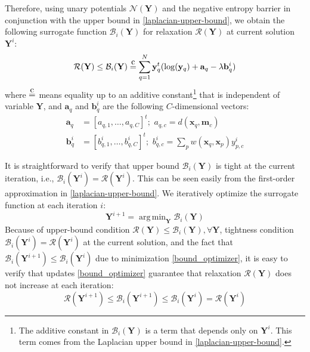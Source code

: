 \documentclass{article}
\DeclareMathOperator*{\argmin}{arg\,min}
\newcommand{\yy}{{\mathbf y}}
\newcommand{\Ncal}{\mathcal{N}}
\newcommand{\Bcal}{\mathcal{B}}
\newcommand{\Rcal}{\mathcal{R}}
\newcommand{\xxq}{\mathbf{x}}
\newcommand{\YY}{\mathbf Y}
\newcommand{\mm}{{\mathbf m}}
\newcommand{\ceq}{\stackrel{\mathclap{\normalfont\mbox{c}}}{=}}
\begin{document}
Therefore, using unary potentials $\Ncal(\YY)$ and the negative entropy barrier
in conjunction with the upper bound in \eqref{laplacian-upper-bound},
we obtain the following surrogate function $\Bcal_i(\YY)$ 
for relaxation $\Rcal(\YY)$ at current solution $\YY^i$:
\begin{equation}
\label{Aux-function}
\Rcal(\YY) \leq \Bcal_i(\YY)  \ceq  \sum_{q =1}^{N} \yy_q^t (\log (\yy_q) + {\mathbf a}_q - \lambda{\mathbf b}_q^i)
\end{equation}
where $\ceq$ means equality up to an additive constant\footnote{The additive constant in $\Bcal_i(\YY)$ is a term that depends only on $\YY^i$. This term comes from the Laplacian upper bound in \eqref{laplacian-upper-bound}.} that is independent of variable $\YY$, and 
${\mathbf a}_q$ and ${\mathbf b}_q^i$ are the following $C$-dimensional vectors:
\begin{subequations} 
\begin{align}
{\mathbf a}_q &=  [a_{q,1}, \dots,a_{q,C}]^t;  \, \, a_{q,c} = d(\xxq_q,\mm_c) \label{aq} \\
{\mathbf b}_q^i &= [b_{q,1}^i, \dots,b_{q,C}^i]^t;  \, \, b_{q,c}^i =   \sum_{p} w (\xxq_q, \xxq_p) y_{p,c}^i \label{bq}
\end{align}
\end{subequations}

It is straightforward to verify that upper bound $\Bcal_i(\YY)$ is tight at the current iteration, i.e., $\Bcal_i(\YY^i) = \Rcal(\YY^i)$.
This can be seen easily from the first-order approximation in \eqref{laplacian-upper-bound}. 
We iteratively optimize the surrogate function at each iteration $i$:
\begin{equation}
\label{bound_optimizer}
\YY^{i+1} = \argmin_{\YY} \Bcal_i(\YY)
\end{equation}
Because of upper-bound condition $\Rcal(\YY) \leq \Bcal_i(\YY), \forall \YY$, tightness condition $\Bcal_i(\YY^i) = \Rcal(\YY^i)$ at the current solution, and the fact that $\Bcal_i(\YY^{i+1}) \leq \Bcal_i(\YY^i)$ due to minimization \eqref{bound_optimizer}, it is easy to verify that updates \eqref{bound_optimizer} guarantee that relaxation ${\Rcal}(\YY)$ does not increase at each iteration: 
\[ \Rcal(\YY^{i+1})\leq \Bcal_i(\YY^{i+1}) \leq \Bcal_i(\YY^i) = \Rcal(\YY^i) \]
\end{document}
